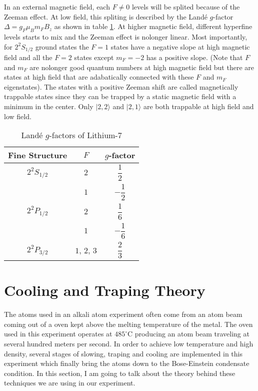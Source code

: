 In an external magnetic field, each $F\neq0$ levels will be splited because of the Zeeman effect. At low field, this spliting is described by the Land\'e $g$-factor $\Delta=g_F\mu_Bm_FB_z$ as shown in table \ref{li7:g-factors}. At higher magnetic field, different hyperfine levels starts to mix and the Zeeman effect is nolonger linear. Most importantly, for $2^2S_{1/2}$ ground states the $F=1$ states have a negative slope at high magnetic field and all the $F=2$ states except $m_F=-2$ has a positive slope. (Note that $F$ and $m_F$ are nolonger good quantum numbers at high magnetic field but there are states at high field that are adabatically connected with these $F$ and $m_F$ eigenstates). The states with a positive Zeeman shift are called magnetically trappable states since they can be trapped by a static magnetic field with a minimum in the center. Only $|2, 2\rangle$ and $|2, 1\rangle$ are both trappable at high field and low field.

\begin{table}
  \caption{Land\'e $g$-factors of Lithium-$7$}
  \label{li7:g-factors}
  \begin{center}
    \begin{tabular}{|c|c|c|}\hline
      Fine Structure & $F$ & $g$-factor \\\hline
      $2^2S_{1/2}$ & $2$ & $\dfrac 12$ \\\cline{2-3}
      & $1$ & $-\dfrac 12$ \\\hline
      $2^2P_{1/2}$ & $2$ & $\dfrac 16$ \\\cline{2-3}
      & $1$ & $-\dfrac 16$ \\\hline
      $2^2P_{3/2}$ & $1$, $2$, $3$ & $\dfrac 23$ \\\hline
    \end{tabular}
  \end{center}
\end{table}

\section{Cooling and Traping Theory}

The atoms used in an alkali atom experiment often come from an atom beam coming out of a oven kept above the melting temperature of the metal. The oven used in this experiment operates at $485^\circ\text{C}$ producing an atom beam traveling at several hundred meters per second. In order to achieve low temperature and high density, several stages of slowing, traping and cooling are implemented in this experiment which finally bring the atoms down to the Bose-Einstein condensate condition. In this section, I am going to talk about the theory behind these techniques we are using in our experiment.

